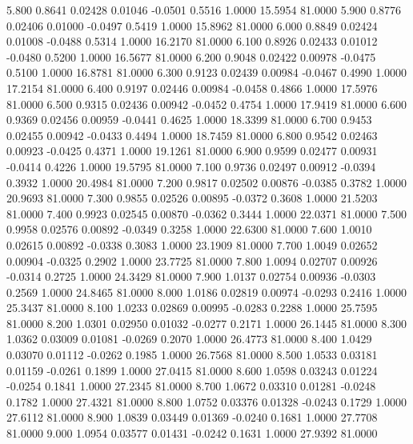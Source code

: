    5.800   0.8641   0.02428   0.01046  -0.0501   0.5516   1.0000  15.5954  81.0000
   5.900   0.8776   0.02406   0.01000  -0.0497   0.5419   1.0000  15.8962  81.0000
   6.000   0.8849   0.02424   0.01008  -0.0488   0.5314   1.0000  16.2170  81.0000
   6.100   0.8926   0.02433   0.01012  -0.0480   0.5200   1.0000  16.5677  81.0000
   6.200   0.9048   0.02422   0.00978  -0.0475   0.5100   1.0000  16.8781  81.0000
   6.300   0.9123   0.02439   0.00984  -0.0467   0.4990   1.0000  17.2154  81.0000
   6.400   0.9197   0.02446   0.00984  -0.0458   0.4866   1.0000  17.5976  81.0000
   6.500   0.9315   0.02436   0.00942  -0.0452   0.4754   1.0000  17.9419  81.0000
   6.600   0.9369   0.02456   0.00959  -0.0441   0.4625   1.0000  18.3399  81.0000
   6.700   0.9453   0.02455   0.00942  -0.0433   0.4494   1.0000  18.7459  81.0000
   6.800   0.9542   0.02463   0.00923  -0.0425   0.4371   1.0000  19.1261  81.0000
   6.900   0.9599   0.02477   0.00931  -0.0414   0.4226   1.0000  19.5795  81.0000
   7.100   0.9736   0.02497   0.00912  -0.0394   0.3932   1.0000  20.4984  81.0000
   7.200   0.9817   0.02502   0.00876  -0.0385   0.3782   1.0000  20.9693  81.0000
   7.300   0.9855   0.02526   0.00895  -0.0372   0.3608   1.0000  21.5203  81.0000
   7.400   0.9923   0.02545   0.00870  -0.0362   0.3444   1.0000  22.0371  81.0000
   7.500   0.9958   0.02576   0.00892  -0.0349   0.3258   1.0000  22.6300  81.0000
   7.600   1.0010   0.02615   0.00892  -0.0338   0.3083   1.0000  23.1909  81.0000
   7.700   1.0049   0.02652   0.00904  -0.0325   0.2902   1.0000  23.7725  81.0000
   7.800   1.0094   0.02707   0.00926  -0.0314   0.2725   1.0000  24.3429  81.0000
   7.900   1.0137   0.02754   0.00936  -0.0303   0.2569   1.0000  24.8465  81.0000
   8.000   1.0186   0.02819   0.00974  -0.0293   0.2416   1.0000  25.3437  81.0000
   8.100   1.0233   0.02869   0.00995  -0.0283   0.2288   1.0000  25.7595  81.0000
   8.200   1.0301   0.02950   0.01032  -0.0277   0.2171   1.0000  26.1445  81.0000
   8.300   1.0362   0.03009   0.01081  -0.0269   0.2070   1.0000  26.4773  81.0000
   8.400   1.0429   0.03070   0.01112  -0.0262   0.1985   1.0000  26.7568  81.0000
   8.500   1.0533   0.03181   0.01159  -0.0261   0.1899   1.0000  27.0415  81.0000
   8.600   1.0598   0.03243   0.01224  -0.0254   0.1841   1.0000  27.2345  81.0000
   8.700   1.0672   0.03310   0.01281  -0.0248   0.1782   1.0000  27.4321  81.0000
   8.800   1.0752   0.03376   0.01328  -0.0243   0.1729   1.0000  27.6112  81.0000
   8.900   1.0839   0.03449   0.01369  -0.0240   0.1681   1.0000  27.7708  81.0000
   9.000   1.0954   0.03577   0.01431  -0.0242   0.1631   1.0000  27.9392  81.0000
